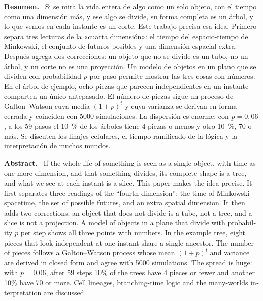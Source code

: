 \documentclass[11pt,a4paper]{article}
\title{\titulo}
\author{Bruno Loiacono\\[2pt]\small Estudiante de Física, Universidad de Buenos Aires}
\date{Noviembre de 2026\\[8pt]\fbox{\small Preprint, documento de trabajo sin revisión por pares}}
\newenvironment{resumen}{\par\noindent\small\textbf{Resumen.}\ }{\par\medskip}
\newenvironment{abstractEN}{\par\noindent\small\begin{otherlanguage}{english}\textbf{Abstract.}\ }{\end{otherlanguage}\par\medskip}
\begin{document}
\maketitle
\thispagestyle{fancy}

\begin{resumen}
Si se mira la vida entera de algo como un solo objeto, con el tiempo como una dimensión más, y ese algo se divide, su forma completa es un árbol, y lo que vemos en cada instante es un corte. Este trabajo precisa esa idea. Primero separa tres lecturas de la «cuarta dimensión»: el tiempo del espacio-tiempo de Minkowski, el conjunto de futuros posibles y una dimensión espacial extra. Después agrega dos correcciones: un objeto que no se divide es un tubo, no un árbol, y un corte no es una proyección. Un modelo de objetos en un plano que se dividen con probabilidad $p$ por paso permite mostrar las tres cosas con números. En el árbol de ejemplo, ocho piezas que parecen independientes en un instante comparten un único antepasado. El número de piezas sigue un proceso de Galton--Watson cuya media $(1+p)^t$ y cuya varianza se derivan en forma cerrada y coinciden con 5000 simulaciones. La dispersión es enorme: con $p = 0{,}06$, a los 59 pasos el 10~\% de los árboles tiene 4 piezas o menos y otro 10~\%, 70 o más. Se discuten los linajes celulares, el tiempo ramificado de la lógica y la interpretación de muchos mundos.
\end{resumen}

\begin{abstractEN}
If the whole life of something is seen as a single object, with time as one more dimension, and that something divides, its complete shape is a tree, and what we see at each instant is a slice. This paper makes the idea precise. It first separates three readings of the “fourth dimension”: the time of Minkowski spacetime, the set of possible futures, and an extra spatial dimension. It then adds two corrections: an object that does not divide is a tube, not a tree, and a slice is not a projection. A model of objects in a plane that divide with probability $p$ per step shows all three points with numbers. In the example tree, eight pieces that look independent at one instant share a single ancestor. The number of pieces follows a Galton--Watson process whose mean $(1+p)^t$ and variance are derived in closed form and agree with 5000 simulations. The spread is huge: with $p = 0.06$, after 59 steps 10\% of the trees have 4 pieces or fewer and another 10\% have 70 or more. Cell lineages, branching-time logic and the many-worlds interpretation are discussed.
\end{abstractEN}
\end{document}
